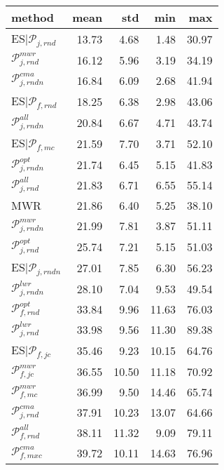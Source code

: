 \begin{tabular}{|@{}l@{}|@{}r@{}|@{}r@{}|@{}r@{}|@{}r@{}|}\hline
method & mean & std & min & max \\ \hline\hline
ES\boldmath$|\mathcal{P}_{j,rnd}$ &  13.73 &  4.68 &  1.48 &  30.97  \\ \hline\hline
\boldmath${\mathcal{P}_{j,rnd}^{mwr}}$ &  16.12 &  5.96 &  3.19 &  34.19  \\ 
${\mathcal{P}_{j,rndn}^{cma}}$ &  16.84 &  6.09 &  2.68 &  41.94  \\ \hline\hline
ES${|\mathcal{P}_{f,rnd}}$ &  18.25 &  6.38 &  2.98 &  43.06  \\ \hline\hline
${\mathcal{P}_{j,rndn}^{all}}$ &  20.84 &  6.67 &  4.71 &  43.74  \\ 
ES${|\mathcal{P}_{f,mc}}$ &  21.59 &  7.70 &  3.71 &  52.10  \\ 
${\mathcal{P}_{j,rndn}^{opt}}$ &  21.74 &  6.45 &  5.15 &  41.83  \\ 
\boldmath${\mathcal{P}_{j,rnd}^{all}}$ &  21.83 &  6.71 &  6.55 &  55.14  \\ 
MWR &  21.86 &  6.40 &  5.25 &  38.10  \\ 
${\mathcal{P}_{j,rndn}^{mwr}}$ &  21.99 &  7.81 &  3.87 &  51.11  \\ \hline\hline
\boldmath${\mathcal{P}_{j,rnd}^{opt}}$ &  25.74 &  7.21 &  5.15 &  51.03  \\ \hline\hline
ES${|\mathcal{P}_{j,rndn}}$ &  27.01 &  7.85 &  6.30 &  56.23  \\ \hline\hline
${\mathcal{P}_{j,rndn}^{lwr}}$ &  28.10 &  7.04 &  9.53 &  49.54  \\ \hline\hline
${\mathcal{P}_{f,rnd}^{opt}}$ &  33.84 &  9.96 &  11.63 &  76.03  \\ 
\boldmath${\mathcal{P}_{j,rnd}^{lwr}}$ &  33.98 &  9.56 &  11.30 &  89.38  \\ \hline\hline
ES${|\mathcal{P}_{f,jc}}$ &  35.46 &  9.23 &  10.15 &  64.76  \\ \hline\hline
${\mathcal{P}_{f,jc}^{mwr}}$ &  36.55 &  10.50 &  11.18 &  70.92  \\ 
${\mathcal{P}_{f,mc}^{mwr}}$ &  36.99 &  9.50 &  14.46 &  65.74  \\ 
\boldmath${\mathcal{P}_{j,rnd}^{cma}}$ &  37.91 &  10.23 &  13.07 &  64.66  \\ 
${\mathcal{P}_{f,rnd}^{all}}$ &  38.11 &  11.32 &  9.09 &  79.11  \\ \hline\hline
${\mathcal{P}_{f,mxc}^{cma}}$ &  39.72 &  10.11 &  14.63 &  76.96  \\ 

\end{tabular}
